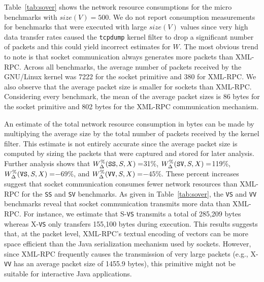 \documentclass{sig-alternate}
\begin{document}

Table~\ref{tab:sover} shows the network resource consumptions for the
micro benchmarks with $size(V) = 500$.  We do not report consumption
measurements for benchmarks that were executed with large $size(V)$
values since very high data transfer rates caused the {\tt tcpdump}
kernel filter to drop a significant number of packets and this could
yield incorrect estimates for $W$.  The most obvious trend to note is
that socket communication always generates more packets than XML-RPC.
Across all benchmarks, the average number of packets received by the
GNU/Linux kernel was 7222 for the socket primitive and 380 for
XML-RPC. We also observe that the average packet size is smaller for
sockets than XML-RPC.  Considering every benchmark, the mean of the
average packet sizes is 86 bytes for the socket primitive and 802
bytes for the XML-RPC communication mechanism.


An estimate of the total network resource consumption in bytes can be
made by multiplying the average size by the total number of packets
received by the kernel filter.  This estimate is not entirely accurate
since the average packet size is computed by sizing the packets that
were captured and stored for later analysis.  Further analysis shows
that {\small $W_\Delta^\%(\mbox{{\tt SS}},S,X)=$}31\%, {\small
  $W_\Delta^\%({\tt SV},S,X)=$}119\%, {\small $W_\Delta^\%(\mbox{{\tt
      VS}},S,X)=$}$-69\%$, and {\small $W_\Delta^\%(\mbox{{\tt
      VV}},S,X) =$}$-45\%$.  These percent increases suggest that
socket communication consumes fewer network resources than XML-RPC for
the \texttt{SS} and \texttt{SV} benchmarks.  As given in
Table~\ref{tab:sover}, the \texttt{VS} and \texttt{VV} benchmarks
reveal that socket communication transmits more data than XML-RPC.
For instance, we estimate that S-{\tt VS} transmits a total of 285,209
bytes whereas X-{\tt VS} only transfers 155,100 bytes during
execution.  This results suggests that, at the packet level, XML-RPC's
textual encoding of vectors can be more space efficient than the Java
serialization mechanism used by sockets.  However, since XML-RPC
frequently causes the transmission of very large packets (e.g., X-{\tt
  VV} has an average packet size of 1455.9 bytes), this primitive
might not be suitable for interactive Java applications.
\end{document}
